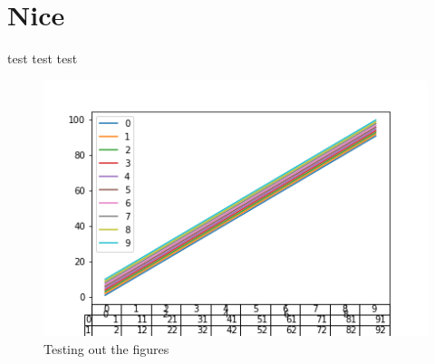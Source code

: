\chapter{Nice}
test test test \cite{gijonmanchenoMappingMangroveOpportunities2021}

% 



\begin{figure}[htbp]
  \centering
  \includegraphics[]{../figures/testfig.png}
  \caption{Testing out the figures}
  \label{testfig}
\end{figure}